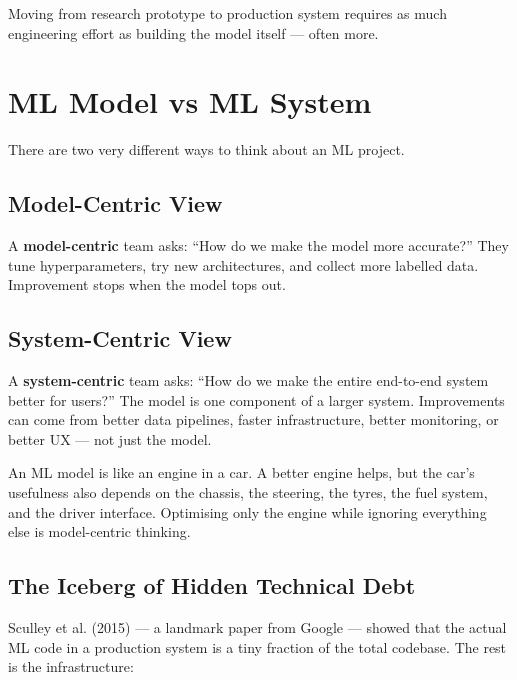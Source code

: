 \documentclass[a4paper,11pt]{article}
\newcommand{\vocab}[1]{\textbf{\color{navy}#1}}
\begin{document}
\begin{keytake}
Moving from research prototype to production system requires as much engineering effort as building the model itself --- often more.
\end{keytake}

\section{ML Model vs ML System}

There are two very different ways to think about an ML project.

\subsection{Model-Centric View}

A \vocab{model-centric} team asks: ``How do we make the model more accurate?'' They tune hyperparameters, try new architectures, and collect more labelled data. Improvement stops when the model tops out.

\subsection{System-Centric View}

A \vocab{system-centric} team asks: ``How do we make the entire end-to-end system better for users?'' The model is one component of a larger system. Improvements can come from better data pipelines, faster infrastructure, better monitoring, or better UX --- not just the model.

\begin{intuition}
An ML model is like an engine in a car. A better engine helps, but the car's usefulness also depends on the chassis, the steering, the tyres, the fuel system, and the driver interface. Optimising only the engine while ignoring everything else is model-centric thinking.
\end{intuition}

\subsection{The Iceberg of Hidden Technical Debt}

Sculley et al. (2015) --- a landmark paper from Google --- showed that the actual ML code in a production system is a tiny fraction of the total codebase. The rest is the infrastructure:
\end{document}
